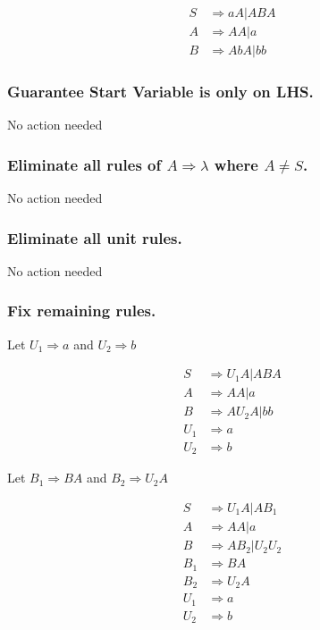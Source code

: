 \documentclass{article}
\begin{document}
\begin{align*}
    S & \Rightarrow aA|ABA \\
    A & \Rightarrow AA|a   \\
    B & \Rightarrow AbA|bb
\end{align*}

\subsubsection{Guarantee Start Variable is only on LHS.}

No action needed

\subsubsection{Eliminate all rules of $A \Rightarrow \lambda$ where $A \neq S$.}

No action needed

\subsubsection{Eliminate all unit rules.}

No action needed

\subsubsection{Fix remaining rules.}

Let $U_1 \Rightarrow a$ and $U_2 \Rightarrow b$

\begin{align*}
    S   & \Rightarrow U_1 A|ABA  \\
    A   & \Rightarrow AA|a       \\
    B   & \Rightarrow A U_2 A|bb \\
    U_1 & \Rightarrow a          \\
    U_2 & \Rightarrow b
\end{align*}

Let $B_1 \Rightarrow BA$ and $B_2 \Rightarrow U_2 A$

\begin{align*}
    S   & \Rightarrow U_1 A | A B_1   \\
    A   & \Rightarrow A A | a         \\
    B   & \Rightarrow A B_2 | U_2 U_2 \\
    B_1 & \Rightarrow B A             \\
    B_2 & \Rightarrow U_2 A           \\
    U_1 & \Rightarrow a               \\
    U_2 & \Rightarrow b
\end{align*}
\end{document}
